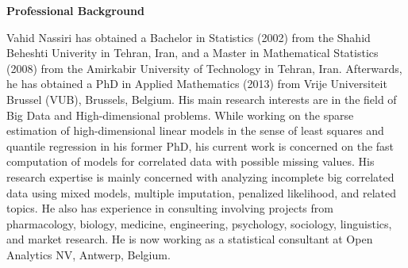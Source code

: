 \documentclass[14pt]{article}
\begin{document}
\begin{center}
{\large{\textbf{Professional Background}}}
\end{center}
\vspace{0.5cm}
Vahid Nassiri  has obtained a Bachelor in Statistics (2002) from the Shahid Beheshti Univerity in Tehran, Iran, and a Master in Mathematical Statistics (2008) from the Amirkabir University of Technology in Tehran, Iran. Afterwards, he has obtained a PhD in Applied Mathematics (2013) from Vrije Universiteit Brussel (VUB), Brussels, Belgium. His main research interests are in the field of Big Data and High-dimensional problems. While working on the sparse estimation of high-dimensional linear models in the sense of least squares and quantile regression in his former PhD, his current work is concerned on the fast computation of models for correlated data with possible missing values. His research expertise is mainly concerned with analyzing incomplete big correlated data using mixed models, multiple imputation, penalized likelihood, and related topics. He also has experience in consulting involving projects from pharmacology, biology, medicine, engineering, psychology, sociology, linguistics, and market research. He is now working as a statistical consultant at Open Analytics NV, Antwerp, Belgium.
\end{document}
